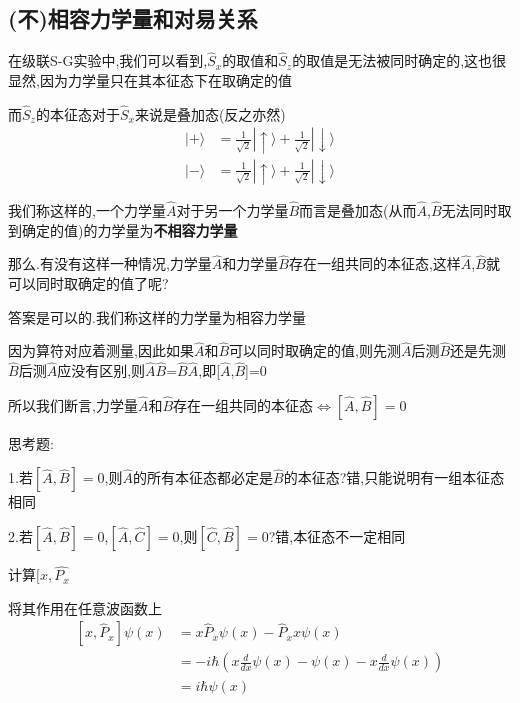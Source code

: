 \documentclass[lang=cn,10pt]{elegantbook}
\begin{document}
\subsection{(不)相容力学量和对易关系}

在级联S-G实验中,我们可以看到,$\hat{S}_{x}$的取值和$\hat{S}_{z}$的取值是无法被同时确定的,这也很显然,因为力学量只在其本征态下在取确定的值

而$\hat{S}_{z}$的本征态对于$\hat{S}_{x}$来说是叠加态(反之亦然)
 \begin{equation*}
	\begin{split}
		|+\rangle &=\frac{1}{\sqrt{2}}|\uparrow \rangle +\frac{1}{\sqrt{2}}|\downarrow \rangle 
		\\
		|-\rangle &=\frac{1}{\sqrt{2}}|\uparrow \rangle +\frac{1}{\sqrt{2}}|\downarrow \rangle 
	\end{split}
\end{equation*}

我们称这样的,一个力学量$\hat{A}$对于另一个力学量$\hat{B}$而言是叠加态(从而$\hat{A}$,$\hat{B}$无法同时取到确定的值)的力学量为\textbf{不相容力学量}

那么.有没有这样一种情况,力学量$\hat{A}$和力学量$\hat{B}$存在一组共同的本征态,这样$\hat{A}$,$\hat{B}$就可以同时取确定的值了呢?

答案是可以的.我们称这样的力学量为相容力学量

因为算符对应着测量,因此如果$\hat{A}$和$\hat{B}$可以同时取确定的值,则先测$\hat{A}$后测$\hat{B}$还是先测$\hat{B}$后测$\hat{A}$应没有区别,则$\hat{A}$$\hat{B}$=$\hat{B}$$\hat{A}$,即[$\hat{A}$,$\hat{B}$]=0

所以我们断言,$\text{力学量}\hat{A}\text{和}\hat{B}\text{存在一组共同的本征态}\Leftrightarrow \left[ \hat{A},\hat{B} \right] =0$


思考题:

1.若$\left[ \hat{A},\hat{B} \right] =0$,则$\hat{A}$的所有本征态都必定是$\hat{B}$的本征态?错,只能说明有一组本征态相同

2.若$\left[ \hat{A},\hat{B} \right] =0$,$\left[ \hat{A},\hat{C} \right] =0$,则$\left[ \hat{C},\hat{B} \right] =0$?错,本征态不一定相同



计算$[x,\hat{P_x}$

将其作用在任意波函数上
\begin{equation*}
	\begin{split}
		\left[ x,\hat{P}_x \right] \psi \left( x \right) &=x\hat{P}_x\psi \left( x \right) -\hat{P}_xx\psi \left( x \right) 
		\\
		&=-i\hbar \left( x\frac{d}{dx}\psi \left( x \right) -\psi \left( x \right) -x\frac{d}{dx}\psi \left( x \right) \right) 
		\\
		&=i\hbar \psi \left( x \right) 
	\end{split}
\end{equation*}
\end{document}
